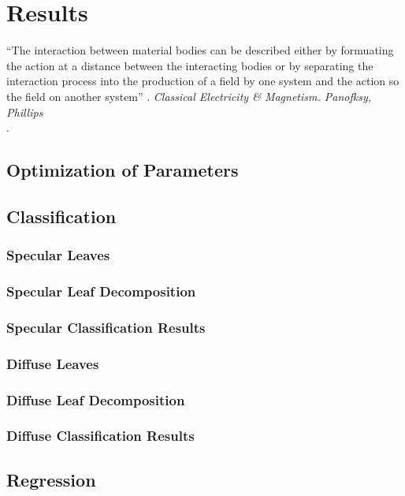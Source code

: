 \chapter{Results}
\begin{center}
  \begin{minipage}{0.75\textwidth}
    \begin{small}
      “The interaction between material bodies can be described either by formuating the action at a distance between the interacting bodies or by separating the interaction process into the production of a field by one system and the action so the field on another system” .
      \emph{Classical Electricity \& Magnetism. Panofksy, Phillips}\\.
    \end{small}
  \end{minipage}
  \vspace{0.5cm}
\end{center}

\section{Optimization of Parameters}

\section{Classification}
\subsection{Specular Leaves}
\subsection{Specular Leaf Decomposition}
\subsection{Specular Classification Results}
\subsection{Diffuse Leaves}
\subsection{Diffuse Leaf Decomposition}
\subsection{Diffuse Classification Results}

\section{Regression}
